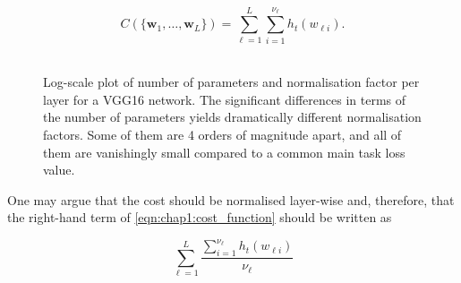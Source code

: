 \begin{equation}
  \label{eqn:chap1:cost_function}
  C(\{\mathbf{w}_1,\dots, \mathbf{w}_L\}) = \displaystyle \sum_{\ell=1}^{L} \sum_{i=1}^{\nu_\ell} h_t(w_{\ell i}). 
\end{equation} \\


\begin{figure}
  \centering
    \caption{ Log-scale plot of
      number of parameters and normalisation factor per layer for a VGG16
      network. The significant differences in terms of the number of parameters
      yields dramatically different normalisation factors. Some of them are 4
      orders of magnitude apart, and all of them are vanishingly small compared
      to a common main task loss value.} 
  \label{fig:chap1:vgg16_per_layer_param_and_norm_factor}
\end{figure}

One may argue that the cost should be normalised layer-wise and, therefore,
that the right-hand term of \cref{eqn:chap1:cost_function} should be written as

$$\displaystyle\sum_{\ell=1}^{L}\frac{\displaystyle \sum_{i=1}^{\nu_\ell}
h_t(w_{\ell i})}{\nu_\ell}$$ 

